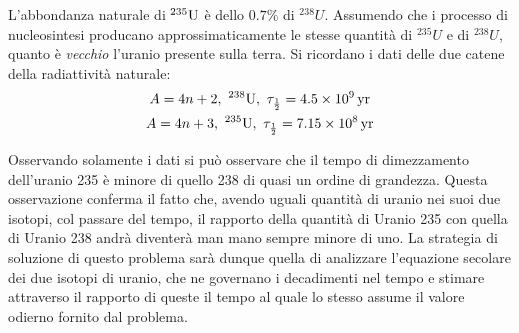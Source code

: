 \documentclass[../main]{subfiles}
\begin{document}
	\begin{ese}[3.2]\label{ese:UDecay}
		L'abbondanza naturale di $ ^{235}\mathrm{U} $ è dello $ 0.7\% $ di $ ^{238}U $. Assumendo che i processo di nucleosintesi producano approssimaticamente le stesse quantità di $ ^{235}U $ e di $ ^{238}U $, quanto è \emph{vecchio} l'uranio presente sulla terra. Si ricordano i dati delle due catene della radiattività naturale:
		\begin{gather}
		A=4n+2,\ ^{238}\mathrm{U},\ \tau_{\frac{1}{2}}=\SI{4.5e9}{yr} \\
		A=4n+3,\ ^{235}\mathrm{U},\ \tau_{\frac{1}{2}}=\SI{7.15e8}{yr}
		\end{gather}
	\end{ese}
	\begin{svol}
		Osservando solamente i dati si può osservare che il tempo di dimezzamento dell'uranio 235 è minore di quello 238 di quasi un ordine di grandezza. Questa osservazione conferma il fatto che, avendo uguali quantità di uranio nei suoi due isotopi, col passare del tempo, il rapporto della quantità di Uranio 235 con quella di Uranio 238 andrà diventerà man mano sempre minore di uno. La strategia di soluzione di questo problema sarà dunque quella di analizzare l'equazione secolare dei due isotopi di uranio, che ne governano i decadimenti nel tempo e stimare attraverso il rapporto di queste il tempo al quale lo stesso assume il valore odierno fornito dal problema. 
		

\end{svol}
\end{document}
